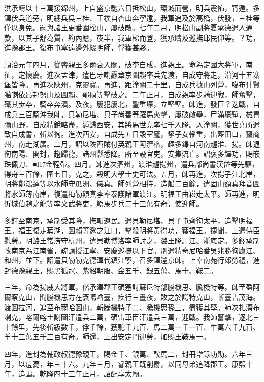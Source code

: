 \begin{pinyinscope}
洪承疇以十三萬援錦州，上自盛京馳六日抵松山，環城而營，明兵震怖，宵遁。多鐸伏兵道旁，明總兵吳三桂、王樸自杏山奔寧遠，我軍追及於高橋，伏發，三桂等僅以身免。嗣與諸王更番圍松山，屢破敵。七年二月，明松山副將夏承德遣人通款，以其子舒為質，約內應，夜半，我軍梯而登，獲承疇及巡撫邱民仰等。？功，進豫郡王。復布屯寧遠邊外綴明師，俘獲甚夥。

順治元年四月，從睿親王多爾袞入關，破李自成，進親王。命為定國大將軍，南征，定懷慶。進次孟津，遣巴牙喇纛章京圖賴率兵先渡，自成守將走，沿河十五寨堡皆降。再進次陜州，克靈寶。再進，距潼關二十里，自成兵據山列營，噶布什賢噶喇依昂邦努山及圖賴、鄂碩等擊破之。二年正月，自成親率步騎迎戰，師奮擊，殲其步卒，騎卒奔潰。及夜，屢犯屢北，鑿重壕，立堅壁。師進，發巨？迭戰，自成兵三百騎沖我師，貝勒尼堪、貝子尚善等躍馬夾擊，屢破敵壘，尸滿壕塹，械胄彌山野，自成精銳略盡，遁歸西安，其將馬世堯率七千人降。入潼關，獲世堯所遣致自成書，斬以徇。進次西安，自成先五日毀室廬，挈子女輜重，出藍田口，竄商州，南走湖廣。二月，詔以陜西賊付英親王阿濟格，趣多鐸自河南趨淮、揚。師退徇南陽、開封，趨歸德，諸州縣悉降。所至設官吏，安集流亡。詔褒多鐸功，賜嵌珠佩刀、■H7金鞓帶。四月，師進次泗州，渡淮趨揚州，遣兵部尚書漢岱等先驅，得舟三百餘，圍七日，克之，殺明大學士史可法。五月，師再進，次揚子江北岸，明將鄭鴻逵等以水師守瓜洲、儀真。師列營相持，造船二百餘，遣固山額真拜音圖將水師薄南岸，復遣梅勒額真李率泰護諸軍渡江。明福王由崧走太平。師再進，明忻城伯趙之龍等率文武將吏，籍馬步兵二十三萬有奇，使迎師。

多鐸至南京，承制受其降，撫輯遺民。遣貝勒尼堪、貝子屯齊徇太平，追擊明福王。福王復走蕪湖，圖賴等邀之江口，擊殺明將黃得功，獲福王。捷聞，上遣侍臣慰勞。明潞王常淓守杭州，遣貝勒博洛率師討之，潞王降。江、浙底定。多鐸承制改南京為江南省，疏請授江寧、安慶巡撫以下官。別遣精奇尼哈番吳兆勝徇廬江、和州，並下。詔遣貝勒勒克德渾代鎮江寧，召多鐸還京師。上幸南苑行郊勞禮，進封德豫親王，賜黑狐冠、紫貂朝服、金五千、銀五萬、馬十、鞍二。

三年，命為揚威大將軍，偕承澤郡王碩塞討蘇尼特部騰機思、騰機特等。師至盈阿爾察克山，聞騰機思方在袞噶嚕臺，疾行三晝夜，敗之於諤特克山，斬臺吉茂海。渡圖拉河，追至布爾哈圖山，斬騰機特子二、騰機思孫三，盡獲其孥。師次扎濟布喇克，喀爾喀土謝圖汗遣兵二萬，碩雷車臣汗遣兵三萬，迎戰。我師奮擊，逐北三十餘里，先後斬級數千，俘千餘，獲駝千九百、馬二萬一千一百、牛萬六千九百、羊十三萬五千三百有奇。師還，上出安定門迎勞，加賜王鞍馬一。

四年，進封為輔政叔德豫親王，賜金千、銀萬、鞍馬二，封冊增錄功勛。六年三月，以痘薨，年三十六。九年三月，睿親王既削爵，以同母弟追降郡王。康熙十年，追謚。乾隆四十三年正月，詔配享太廟。


\end{pinyinscope}
